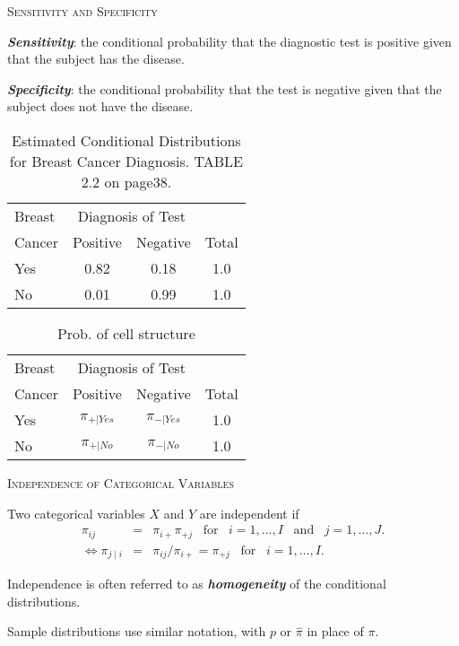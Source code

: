 \documentclass[dvipdfmx, serif,handout]{beamer}
\begin{document}
\begin{frame}{\textsc{Sensitivity and Specificity}}

\bi
\item {\bf{\em Sensitivity}}: the conditional probability that the diagnostic test is positive given that the subject has the disease.
\item {\bf{\em Specificity}}: the conditional probability that the test is negative given that the subject does not have the disease.
{\scriptsize
\begin{table}
\renewcommand{\arraystretch}{1.0}
\begin{tabular}{lccc} \\ \hline
Breast & \multicolumn{2}{c}{Diagnosis of Test} \\ \cline{2-3}
Cancer & Positive & Negative & Total \\ \hline
Yes & 0.82 & 0.18 & 1.0 \\
No & 0.01 & 0.99 & 1.0 \\ \hline
\end{tabular}
\caption{\scriptsize Estimated Conditional Distributions for Breast Cancer Diagnosis. TABLE 2.2 on page38.}
\end{table}
}
{\scriptsize
\begin{table}
\renewcommand{\arraystretch}{1.0}
\begin{tabular}{lccc} \\ \hline
Breast & \multicolumn{2}{c}{Diagnosis of Test} \\ \cline{2-3}
Cancer & Positive & Negative & Total \\ \hline
Yes & $\pi_{+|Yes}$ & $\pi_{-|Yes}$ & 1.0 \\
No & $\pi_{+|No}$ & $\pi_{-|No}$ & 1.0 \\ \hline
\end{tabular}
\caption{\scriptsize Prob. of cell structure}
\end{table}
}


\ei

\end{frame}
\begin{frame}{\textsc{Independence of Categorical Variables}}

\bi
\item Two categorical variables $X$ and $Y$ are independent if
\begin{eqnarray*}
\pi_{ij} &=& \pi_{i+}\pi_{+j}\;\;\; \mbox{for}\;\;\; i=1,\ldots, I\;\;\;\mbox{and}\;\;\; j=1,\ldots,J. \\
\Leftrightarrow \pi_{j \mid i} &=& \pi_{ij}/\pi_{i+}=\pi_{+j}\;\;\; \mbox{for}\;\;\; i=1,\ldots, I.
\end{eqnarray*}
\item Independence is often referred to as {\bf{\em homogeneity}} of the conditional distributions.
\item Sample distributions use similar notation, with $p$ or $\hat{\pi}$ in place of $\pi$.
\ei

\end{frame}
\end{document}
